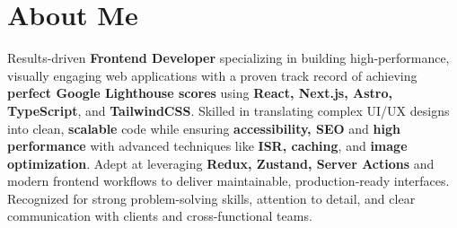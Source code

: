 \section{About Me}

Results-driven \textbf{Frontend Developer} specializing in building high-performance, visually engaging web applications with a proven track record of achieving \textbf{perfect Google Lighthouse scores} using \textbf{React, Next.js, Astro, TypeScript}, and \textbf{TailwindCSS}. Skilled in translating complex UI/UX designs into clean, \textbf{scalable} code while ensuring \textbf{accessibility, SEO} and \textbf{high performance} with advanced techniques like \textbf{ISR, caching}, and \textbf{image optimization}. Adept at leveraging \textbf{Redux, Zustand, Server Actions} and modern frontend workflows to deliver maintainable, production-ready interfaces. Recognized for strong problem-solving skills, attention to detail, and clear communication with clients and cross-functional teams.
